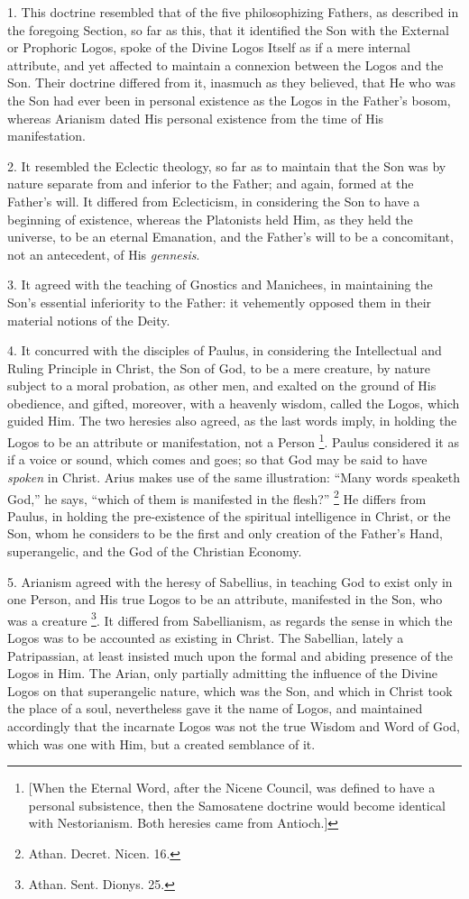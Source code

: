 1. This doctrine resembled that of the five philosophizing Fathers,
as described in the foregoing Section, so far as this, that it
identified the Son with the External or Prophoric Logos, spoke of the
Divine Logos Itself as if a mere internal attribute, and yet affected
to maintain a connexion between the Logos and the Son. Their doctrine
differed from it, inasmuch as they believed, that He who was the Son
had ever been in personal existence as the Logos in the Father's
bosom, whereas Arianism dated His personal existence from the time of
His manifestation.

2. It resembled the Eclectic theology, so far as to maintain that
the Son was by nature separate from and inferior to the Father; and
again, formed at the Father's will. It differed from Eclecticism, in
considering the Son to have a beginning of existence, whereas the
Platonists held Him, as they held the universe, to be an eternal
Emanation, and the Father's will to be a concomitant, not an
antecedent, of His \emph{gennesis}.

3. It agreed with the teaching of Gnostics and Manichees, in
maintaining the Son's essential inferiority to the Father: it
vehemently opposed them in their material notions of the Deity.

4. It concurred with the disciples of Paulus, in considering the
Intellectual and Ruling Principle in Christ, the Son of God, to be a
mere creature, by nature subject to a moral probation, as other men,
and exalted on the ground of His obedience, and gifted, moreover, with
a heavenly wisdom, called the Logos, which guided Him. The two
heresies also agreed, as the last words imply, in holding the Logos to
be an attribute or manifestation, not a Person \footnote{[When the Eternal Word, after the Nicene
Council, was defined to have a personal subsistence, then the
Samosatene doctrine would become identical with Nestorianism. Both
heresies came from Antioch.]}. Paulus considered it as if a voice or sound, which comes and
goes; so that God may be said to have \emph{spoken} in Christ. Arius
makes use of the same illustration: ``Many words speaketh
God,'' he says, ``which of them is manifested in the
flesh?'' \footnote{Athan. Decret. Nicen. 16.} He differs
from Paulus, in holding the pre-existence of the spiritual
intelligence in Christ, or the Son, whom he considers to be the first
and only creation of the Father's Hand, superangelic, and the God of
the Christian Economy.

5. Arianism agreed with the heresy of Sabellius, in teaching God to
exist only in one Person, and His true Logos to be an attribute,
manifested in the Son, who was a creature \footnote{Athan. Sent. Dionys. 25.}. It differed from Sabellianism, as regards the sense in which
the Logos was to be accounted as existing in Christ. The Sabellian,
lately a Patripassian, at least insisted much upon the formal and
abiding presence of the Logos in Him. The Arian, only partially
admitting the influence of the Divine Logos on that superangelic
nature, which was the Son, and which in Christ took the place of a
soul, nevertheless gave it the name of Logos, and maintained
accordingly that the incarnate Logos was not the true Wisdom and Word
of God, which was one with Him, but a created semblance of it.

